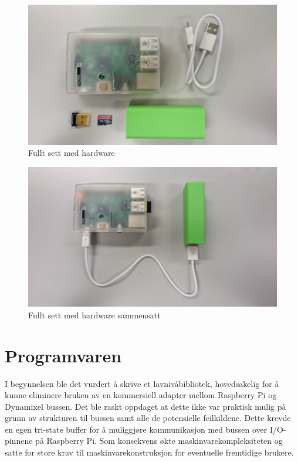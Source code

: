 \documentclass[12pt]{report}
\begin{document}
\begin{figure}[H]
	\includegraphics[scale=0.07]{imgs/full_set}
	\centering
	\caption{Fullt sett med hardware}
	\label{fllsett}
\end{figure}

\begin{figure}[H]
	\includegraphics[scale=0.07]{imgs/assembled}
	\centering
	\caption{Fullt sett med hardware sammensatt}
	\label{fllsett}
\end{figure}

\section{Programvaren}
I begynnelsen ble det vurdert å skrive et lavnivåbibliotek, hovedsakelig for å kunne eliminere bruken av en kommersiell adapter mellom Raspberry Pi og Dynamixel bussen. Det ble raskt oppdaget at dette ikke var praktisk mulig på grunn av strukturen til bussen samt alle de potensielle feilkildene. Dette krevde en egen tri-state buffer\cite{triBuff} for å muliggjøre kommunikasjon med bussen over I/O-pinnene på Raspberry Pi. Som konsekvens økte maskinvarekompleksiteten og satte for store krav til maskinvarekonstruksjon for eventuelle fremtidige brukere.
\end{document}
